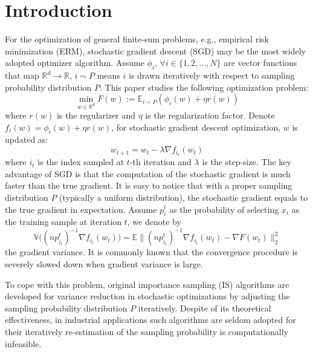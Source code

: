 \documentclass[twoside,leqno,twocolumn]{article}
\begin{document}
\section{Introduction}
For the optimization of general finite-sum problems, e.g., empirical risk minimization (ERM), stochastic gradient descent (SGD) may be the most widely adopted optimizer algorithm. Assume $\phi_{i}$, $\forall i\in\{1,2,...,N\}$ are vector functions that map $\mathbb{R}^d\to\mathbb{R}$, $i\sim P$ means $i$ is drawn iteratively with respect to sampling probability distribution $P$. This paper studies the following optimization problem:
\begin{equation}
\label{opt}
\mathop{\mathrm{min}}_{w\in \mathbb{R}^d}F(w):=\mathbb{E}_{i\sim P}(\phi_i(w)+\eta r(w))
\end{equation}
where $r(w)$ is the regularizer and $\eta$ is the regularization factor. Denote $f_i(w)=\phi_i(w)+\eta r(w)$, for stochastic gradient descent optimization, $w$ is updated as:
\begin{equation}
\label{update}
w_{t+1} = w_t-\lambda\nabla f_{i_t}(w_t)
\end{equation} 
where ${i_t}$ is the index sampled at $t$-th iteration and $\lambda$ is the step-size. The key advantage of SGD is that the computation of the stochastic gradient is much faster than the true gradient. It is easy to notice that with a proper sampling distribution $P$ (typically a uniform distribution), the stochastic gradient equals to the true gradient in expectation. Assume $p_i^t$ as the probability of selecting $x_i$ as the training sample at iteration $t$, we denote by
\begin{equation}
\mathbb{V}\big((np^t_{i_t})^{-1}\nabla f_{i_t}(w_t)\big)=\mathbb{E}\|(np^t_{i_t})^{-1}\nabla f_{i_t}(w_t)-\nabla F(w_t)\|_2^2
\end{equation}
the gradient variance. It is commonly known that the convergence procedure is severely slowed down when gradient variance is large.

To cope with this problem, original importance sampling (IS) algorithms \cite{alain2015variance, Siddharth, hazan2011beating, Bach} are developed for variance reduction in stochastic optimizations by adjusting the sampling probability distribution $P$ iteratively. Despite of its theoretical effectiveness, in industrial applications such algorithms are seldom adopted for their iteratively re-estimation of the sampling probability is computationally infeasible. 
\end{document}

